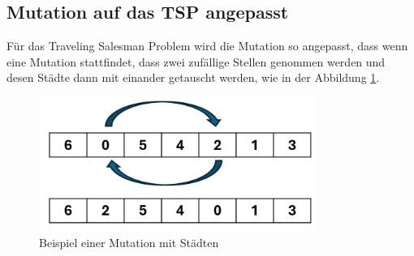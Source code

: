 \subsection{Mutation auf das TSP angepasst
\label{buch:paper:varalg:subsection:mutation_tsp}}
Für das Traveling Salesman Problem wird die Mutation so angepasst,
dass wenn eine Mutation stattfindet, dass zwei zufällige Stellen 
genommen werden und desen Städte dann mit einander getauscht werden, 
wie in der Abbildung \ref{fig:mutation_genetic_string_cities}.
\begin{figure}
	\centering
	\includegraphics[width=0.8\textwidth]{
        papers/varalg/images/teil3/09GeneticStringCitiesMutation.png
        }
	\caption{Beispiel einer Mutation mit Städten}
	\label{fig:mutation_genetic_string_cities}
\end{figure}
